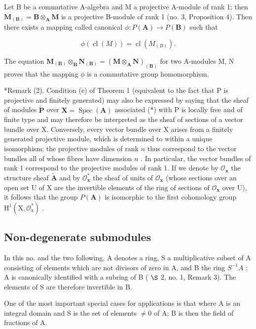 Let B be a commutative A-algebra and M a projective A-module of rank 1; then \(\mathbf{M}_{(\mathbf{B})} = \mathbf{B} \otimes_{\mathbf{A}} \mathbf{M}\) is a projective B-module of rank 1 (no. 3, Proposition 4). Then there exists a mapping called canonical \(\phi: P(\mathbf{A}) \to P(\mathbf{B})\) such that

\[
\phi (\operatorname{cl} (M)) = \operatorname{cl} (M _ {(B)}).\tag{8}
\]

The equation \(\mathbf{M}_{(\mathbf{B})}\otimes_{\mathbf{B}}\mathbf{N}_{(\mathbf{B})}=(\mathbf{M}\otimes_{\mathbf{A}}\mathbf{N})_{(\mathbf{B})}\) for two A-modules M, N proves that the mapping \(\phi\) is a commutative group homomorphism.

*Remark (2). Condition (e) of Theorem 1 (equivalent to the fact that P is projective and finitely generated) may also be expressed by saying that the sheaf of modules \(\tilde{\mathbf{P}}\) over \(\mathbf{X} = \operatorname{Spec}(\mathbf{A})\) associated (*) with P is locally free and of finite type and may therefore be interpreted as the sheaf of sections of a vector bundle over X. Conversely, every vector bundle over X arises from a finitely generated projective module, which is determined to within a unique isomorphism; the projective modules of rank \(n\) thus correspond to the vector bundles all of whose fibres have dimension \(n\) . In particular, the vector bundles of rank 1 correspond to the projective modules of rank 1. If we denote by \(\mathcal{O}_{\mathbf{x}}\) the structure sheaf \(\tilde{\mathbf{A}}\) and by \(\mathcal{O}_{\mathbf{x}}^{*}\) the sheaf of units of \(\mathcal{O}_{\mathbf{x}}\) (whose sections over an open set U of X are the invertible elements of the ring of sections of \(\mathcal{O}_{\mathbf{x}}\) over U), it follows that the group \(P(\mathbf{A})\) is isomorphic to the first cohomology group \(\mathrm{H}^1 (\mathrm{X},\mathcal{O}_\mathrm{x}^*)\) .

\subsection{Non-degenerate submodules}

In this no. and the two following, A denotes a ring, S a multiplicative subset of A consisting of elements which are not divisors of zero in A, and B the ring \(S^{-1}A\) ; A is canonically identified with a subring of B ( \(\S\) 2, no. 1, Remark 3). The elements of S are therefore invertible in B.

One of the most important special cases for applications is that where A is an integral domain and S is the set of elements \(\neq0\) of A; B is then the field of fractions of A.


